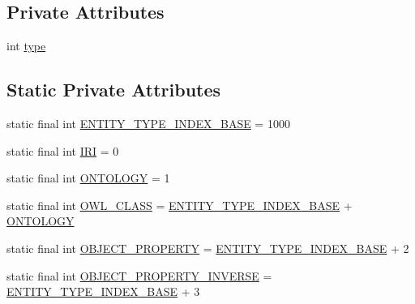 \subsection*{Private Attributes}
\begin{DoxyCompactItemize}
\item 
int \hyperlink{classorg_1_1semanticweb_1_1owlapi_1_1util_1_1_o_w_l_object_type_index_provider_add577f4c9b20fccc32e6f69229ba7f9b}{type}
\end{DoxyCompactItemize}
\subsection*{Static Private Attributes}
\begin{DoxyCompactItemize}
\item 
static final int \hyperlink{classorg_1_1semanticweb_1_1owlapi_1_1util_1_1_o_w_l_object_type_index_provider_aea540c2bf120be0ba29ce856a8f2c36f}{E\-N\-T\-I\-T\-Y\-\_\-\-T\-Y\-P\-E\-\_\-\-I\-N\-D\-E\-X\-\_\-\-B\-A\-S\-E} = 1000
\item 
static final int \hyperlink{classorg_1_1semanticweb_1_1owlapi_1_1util_1_1_o_w_l_object_type_index_provider_ad9762be5be0226b904beeab4d21d47c0}{I\-R\-I} = 0
\item 
static final int \hyperlink{classorg_1_1semanticweb_1_1owlapi_1_1util_1_1_o_w_l_object_type_index_provider_acad8c3c46e53d45cb5ff8ea21666e616}{O\-N\-T\-O\-L\-O\-G\-Y} = 1
\item 
static final int \hyperlink{classorg_1_1semanticweb_1_1owlapi_1_1util_1_1_o_w_l_object_type_index_provider_aee6b700d2bbc71570ed6fb6d39c34741}{O\-W\-L\-\_\-\-C\-L\-A\-S\-S} = \hyperlink{classorg_1_1semanticweb_1_1owlapi_1_1util_1_1_o_w_l_object_type_index_provider_aea540c2bf120be0ba29ce856a8f2c36f}{E\-N\-T\-I\-T\-Y\-\_\-\-T\-Y\-P\-E\-\_\-\-I\-N\-D\-E\-X\-\_\-\-B\-A\-S\-E} + \hyperlink{classorg_1_1semanticweb_1_1owlapi_1_1util_1_1_o_w_l_object_type_index_provider_acad8c3c46e53d45cb5ff8ea21666e616}{O\-N\-T\-O\-L\-O\-G\-Y}
\item 
static final int \hyperlink{classorg_1_1semanticweb_1_1owlapi_1_1util_1_1_o_w_l_object_type_index_provider_abbd341e89abe971c4c97bf9b5453f843}{O\-B\-J\-E\-C\-T\-\_\-\-P\-R\-O\-P\-E\-R\-T\-Y} = \hyperlink{classorg_1_1semanticweb_1_1owlapi_1_1util_1_1_o_w_l_object_type_index_provider_aea540c2bf120be0ba29ce856a8f2c36f}{E\-N\-T\-I\-T\-Y\-\_\-\-T\-Y\-P\-E\-\_\-\-I\-N\-D\-E\-X\-\_\-\-B\-A\-S\-E} + 2
\item 
static final int \hyperlink{classorg_1_1semanticweb_1_1owlapi_1_1util_1_1_o_w_l_object_type_index_provider_a68a58c534783225206dded36b525868c}{O\-B\-J\-E\-C\-T\-\_\-\-P\-R\-O\-P\-E\-R\-T\-Y\-\_\-\-I\-N\-V\-E\-R\-S\-E} = \hyperlink{classorg_1_1semanticweb_1_1owlapi_1_1util_1_1_o_w_l_object_type_index_provider_aea540c2bf120be0ba29ce856a8f2c36f}{E\-N\-T\-I\-T\-Y\-\_\-\-T\-Y\-P\-E\-\_\-\-I\-N\-D\-E\-X\-\_\-\-B\-A\-S\-E} + 3

\end{DoxyCompactItemize}
